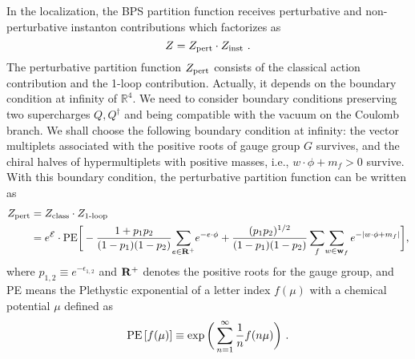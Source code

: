 In the localization, the BPS partition function receives perturbative and non-perturbative instanton contributions which factorizes as
\begin{equation}
	Z=Z_{\rm pert}\cdot Z_{\rm inst} \ .
\end{equation}
The perturbative partition function $Z_{\rm pert}$ consists of the classical action contribution and the 1-loop contribution. Actually, it depends on the boundary condition at infinity of $\mathbb{R}^4$. We need to consider boundary conditions preserving two supercharges $Q,Q^\dagger$ and being compatible with the vacuum on the Coulomb branch. We shall choose the following boundary condition at infinity: the vector multiplets associated with the positive roots of gauge group $G$ survives, and the chiral halves of hypermultiplets with positive masses, {i.e.,} $w\cdot \phi +m_f>0$ survive. With this boundary condition, the perturbative partition function can be written as
\begin{align}\label{eq:Zpert=cx1-loop}
	Z_{\rm pert} &= Z_{\rm class}\cdot Z_{\text{1-loop}} \\
	&= e^{\mathcal{E}} \cdot {\rm PE}\bigg[-\frac{1+p_1p_2}{(1-p_1)(1-p_2)}\!\sum_{e\in{\bf R}^+}\!e^{-e\cdot\phi}+\frac{(p_1p_2)^{1/2}}{(1-p_1)(1-p_2)}\sum_f\!\sum_{w\in{\bf w}_f}e^{-|w\cdot\phi+m_f|}\bigg], \nonumber
\end{align}
where $p_{1,2}\equiv e^{-\epsilon_{1,2}}$ and ${\bf R}^+$ denotes the positive roots for the gauge group, and PE means the Plethystic exponential of a letter index $f(\mu)$ with a chemical potential $\mu$ defined as
\begin{equation}
	\PE\left[f(\mu)\right] \equiv \exp\bigg(\sum_{n=1}^\infty \frac{1}{n}f(n\mu)\bigg) \ .\label{eq:PE}
\end{equation}

